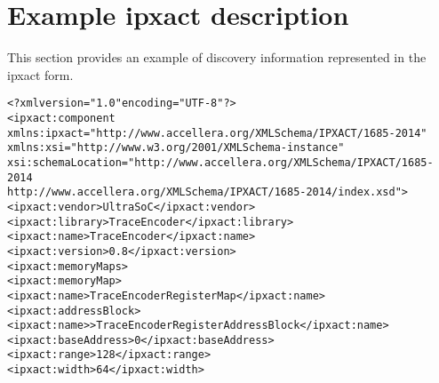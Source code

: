 \FloatBarrier
\section{Example ipxact description} \label{sec:ipxact}

This section provides an example of discovery information represented in
the ipxact form.

\begin{alltt}
<?xml version="1.0" encoding="UTF-8"?>
<ipxact:component 
   xmlns:ipxact="http://www.accellera.org/XMLSchema/IPXACT/1685-2014"
   xmlns:xsi="http://www.w3.org/2001/XMLSchema-instance" 
   xsi:schemaLocation="http://www.accellera.org/XMLSchema/IPXACT/1685-2014 
                       http://www.accellera.org/XMLSchema/IPXACT/1685-2014/index.xsd">
   <ipxact:vendor>UltraSoC</ipxact:vendor>
   <ipxact:library>TraceEncoder</ipxact:library>
   <ipxact:name>TraceEncoder</ipxact:name>
   <ipxact:version>0.8</ipxact:version>
   <ipxact:memoryMaps>
      <ipxact:memoryMap>
         <ipxact:name>Trace Encoder Register Map</ipxact:name>
         <ipxact:addressBlock>
            <ipxact:name>>Trace Encoder Register Address Block</ipxact:name>
            <ipxact:baseAddress>0</ipxact:baseAddress>
            <ipxact:range>128</ipxact:range>
            <ipxact:width>64</ipxact:width>


\end{alltt}
